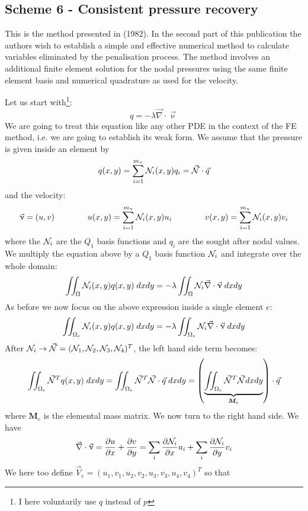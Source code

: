 \subsection{Scheme 6 - Consistent pressure recovery \label{ss:cpr}}

This is the method presented in \textcite{zina82} (1982). In the second part 
of this publication the authors wish to establish a simple and effective 
numerical method to calculate variables eliminated by the penalisation process. 
The method involves an additional finite element solution for the nodal 
pressures using the same finite element basis and numerical quadrature 
as used for the velocity.

Let us start with\footnote{I here voluntarily use $q$ instead of $p$}:
\[
q = -\lambda \vec\nabla\cdot \vec\upnu
\]
We are going to treat this equation like any other PDE in the context 
of the FE method, i.e. we are going to establish its weak form. 
We assume that the pressure is given inside an element by
\[
q(x,y) = \sum_{i=1}^{m_\upnu} {\mathcal{N}}_i(x,y) q_i = \vec{{\mathcal{N}}} \cdot \vec{q}
\]
and the velocity:
\[
\vec\upnu = (u,v) 
\qquad 
\qquad 
u(x,y)  = \sum_{i=1}^{m_\upnu} {\mathcal{N}}_i(x,y) u_i
\qquad 
\qquad 
v(x,y)  = \sum_{i=1}^{m_\upnu} {\mathcal{N}}_i(x,y) v_i
\]
where the ${\mathcal{N}}_i$ are the $Q_1$ basis functions and $q_i$ are the sought after nodal values. 
We multiply the equation above by a $Q_1$ basis function ${\mathcal{N}}_i$ and integrate over the whole domain:
\[
\iint_\Omega {\mathcal{N}}_i(x,y) q(x,y) \; dxdy 
= -\lambda \iint_\Omega {\mathcal{N}}_i \vec\nabla\cdot \vec\upnu  \; dx dy
\]
As before we now focus on the above expression inside a single element $e$:
\[
\iint_{\Omega_e} {\mathcal{N}}_i(x,y) q(x,y) \; dxdy = -\lambda \iint_{\Omega_e} {\mathcal{N}}_i \vec\nabla\cdot \vec\upnu \; dx dy
\]
After ${\mathcal{N}}_i \rightarrow \vec{{\mathcal{N}}}=({\mathcal{N}}_1,{\mathcal{N}}_2,{\mathcal{N}}_3,{\mathcal{N}}_4)^T$, the left hand side term becomes:
\[
\iint _{\Omega_e} \vec{{\mathcal{N}}}^T q(x,y) \; dxdy 
=
\iint _{\Omega_e} \vec{{\mathcal{N}}}^T \vec{{\mathcal{N}}} \cdot \vec{q} \; dxdy 
=
\left(\underbrace{\iint _{\Omega_e} \vec{{\mathcal{N}}}^T \vec{{\mathcal{N}}} dxdy}_{{\bm M}_e} \right) \cdot \vec{q}  
\]
where ${\bm M}_e$ is the elemental mass matrix.
We now turn to the right hand side. We have
\[
\vec\nabla\cdot \vec\upnu
= \frac{\partial u}{\partial x}+\frac{\partial v}{\partial y}
= \sum_i \frac{\partial {\mathcal{N}}_i}{\partial x} u_i + \sum_i \frac{\partial {\mathcal{N}}_i}{\partial y} v_i 
\]
We here too define $\vec{V}_e=(u_1,v_1,u_2,v_2,u_3,v_3,u_4,v_4)^T$ so that 

